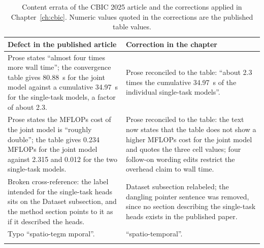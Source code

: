 \begin{table}[htb]
\caption{Content errata of the CBIC 2025 article and the corrections applied in
Chapter~\ref{ch:cbic}. Numeric values quoted in the corrections are the published
table values.}
\label{tab:apx:cbic-errata}
\centering
\small
\begin{tabular}{@{}p{}p{}@{}}
\toprule
\textbf{Defect in the published article} & \textbf{Correction in the chapter} \\
\midrule
Prose states ``almost four times more wall time''; the convergence table gives
80.88~s for the joint model against a cumulative 34.97~s for the single-task models,
a factor of about 2.3. &
Prose reconciled to the table: ``about 2.3 times the cumulative 34.97~s of the
individual single-task models''. \\
\addlinespace
Prose states the MFLOPs cost of the joint model is ``roughly double''; the
table gives 0.234 MFLOPs for the joint model against 2.315 and 0.012 for the two
single-task models. &
Prose reconciled to the table: the text now states that the table does not show a
higher MFLOPs cost for the joint model and quotes the three cell values; four
follow-on wording edits restrict the overhead claim to wall time. \\
\addlinespace
Broken cross-reference: the label intended for the single-task heads sits on the
Dataset subsection, and the method section points to it as if it described the heads. &
Dataset subsection relabeled; the dangling pointer sentence was removed, since no
section describing the single-task heads exists in the published paper. \\
\addlinespace
Typo ``spatio-tegm mporal''. &
``spatio-temporal''. \\
\addlinespace

\end{tabular}
\end{table}
